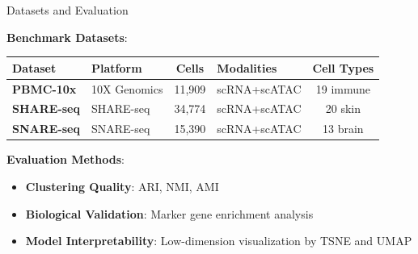 \documentclass{beamer}
\begin{document}
\begin{frame}{Datasets and Evaluation}

\textbf{Benchmark Datasets}:

\begin{table}[h]
\centering
\scriptsize
\begin{tabular}{|l|l|c|l|c|}
\hline
\rule{0pt}{3ex}\textbf{Dataset} & \textbf{Platform} & \textbf{Cells} & \textbf{Modalities} & \textbf{Cell Types}\rule[-1.5ex]{0pt}{0pt} \\
\hline
\rule{0pt}{3ex}\textbf{PBMC-10x} & 10X Genomics & 11,909 & scRNA+scATAC & 19 immune\rule[-1.5ex]{0pt}{0pt} \\
\hline
\rule{0pt}{3ex}\textbf{SHARE-seq} & SHARE-seq & 34,774 & scRNA+scATAC & 20 skin\rule[-1.5ex]{0pt}{0pt} \\
\hline 
\rule{0pt}{3ex}\textbf{SNARE-seq} & SNARE-seq & 15,390 & scRNA+scATAC & 13 brain\rule[-1.5ex]{0pt}{0pt} \\
\hline
\end{tabular}
\end{table}

\textbf{Evaluation Methods}:

\begin{itemize}
\item \textbf{Clustering Quality}: ARI, NMI, AMI
\item \textbf{Biological Validation}: Marker gene enrichment analysis
\item \textbf{Model Interpretability}: Low-dimension visualization by TSNE and UMAP
\end{itemize}
\end{frame}
\end{document}
